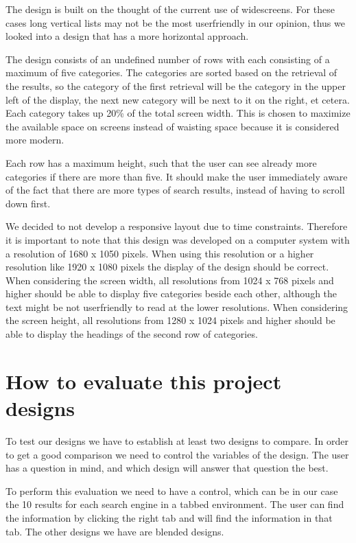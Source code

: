 \documentclass[12pt]{article}
\begin{document}
The design is built on the thought of the current use of widescreens.
For these cases long vertical lists may not be the most userfriendly in our opinion, thus we looked into a design that has a more horizontal approach.

The design consists of an undefined number of rows with each consisting of a maximum of five categories.
The categories are sorted based on the retrieval of the results, so the category of the first retrieval will be the category in the upper left of the display, the next new category will be next to it on the right, et cetera.
Each category takes up 20\% of the total screen width.
This is chosen to maximize the available space on screens instead of waisting space because it is considered more modern.

Each row has a maximum height, such that the user can see already more categories if there are more than five.
It should make the user immediately aware of the fact that there are more types of search results, instead of having to scroll down first.

We decided to not develop a responsive layout due to time constraints.
Therefore it is important to note that this design was developed on a computer system with a resolution of 1680 x 1050 pixels.
When using this resolution or a higher resolution like 1920 x 1080 pixels the display of the design should be correct.
When considering the screen width, all resolutions from 1024 x 768 pixels and higher should be able to display five categories beside each other, although the text might be not userfriendly to read at the lower resolutions.
When considering the screen height, all resolutions from 1280 x 1024 pixels and higher should be able to display the headings of the second row of categories.

\section{How to evaluate this project designs}
\label{sec:evaluation}
To test our designs we have to establish at least two designs to compare. 
In order to get a good comparison we need to control the variables of the design. 
The user has a question in mind, and which design will answer that question the best. 

To perform this evaluation we need to have a control, which can be in our case the 10 results for each search engine in a tabbed environment. The user can find the information by clicking the right tab and will find the information in that tab. The other designs we have are blended designs.
\end{document}
